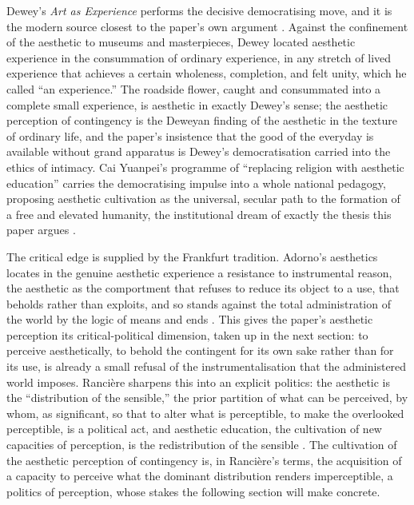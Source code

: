 Dewey's \emph{Art as Experience} performs the decisive democratising move, and it is the modern source closest to the paper's own argument \parencite{dewey1934}. Against the confinement of the aesthetic to museums and masterpieces, Dewey located aesthetic experience in the consummation of ordinary experience, in any stretch of lived experience that achieves a certain wholeness, completion, and felt unity, which he called ``an experience.'' The roadside flower, caught and consummated into a complete small experience, is aesthetic in exactly Dewey's sense; the aesthetic perception of contingency is the Deweyan finding of the aesthetic in the texture of ordinary life, and the paper's insistence that the good of the everyday is available without grand apparatus is Dewey's democratisation carried into the ethics of intimacy. Cai Yuanpei's programme of ``replacing religion with aesthetic education'' carries the democratising impulse into a whole national pedagogy, proposing aesthetic cultivation as the universal, secular path to the formation of a free and elevated humanity, the institutional dream of exactly the thesis this paper argues \parencite{caiyuanpei2015}.

The critical edge is supplied by the Frankfurt tradition. Adorno's aesthetics locates in the genuine aesthetic experience a resistance to instrumental reason, the aesthetic as the comportment that refuses to reduce its object to a use, that beholds rather than exploits, and so stands against the total administration of the world by the logic of means and ends \parencite{adorno1997}. This gives the paper's aesthetic perception its critical-political dimension, taken up in the next section: to perceive aesthetically, to behold the contingent for its own sake rather than for its use, is already a small refusal of the instrumentalisation that the administered world imposes. Rancière sharpens this into an explicit politics: the aesthetic is the ``distribution of the sensible,'' the prior partition of what can be perceived, by whom, as significant, so that to alter what is perceptible, to make the overlooked perceptible, is a political act, and aesthetic education, the cultivation of new capacities of perception, is the redistribution of the sensible \parencite{ranciere2004}. The cultivation of the aesthetic perception of contingency is, in Rancière's terms, the acquisition of a capacity to perceive what the dominant distribution renders imperceptible, a politics of perception, whose stakes the following section will make concrete.

